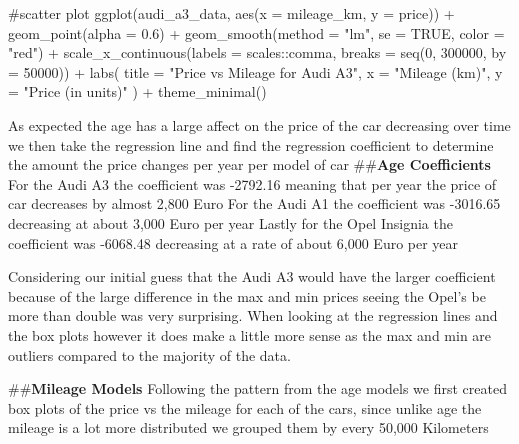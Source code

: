 \documentclass[
  letterpaper,
  DIV=11,
  numbers=noendperiod]{scrartcl}
\newenvironment{Shaded}{\begin{snugshade}}{\end{snugshade}}
\newcommand{\AttributeTok}[1]{\textcolor[rgb]{0.40,0.45,0.13}{#1}}
\newcommand{\CommentTok}[1]{\textcolor[rgb]{0.37,0.37,0.37}{#1}}
\newcommand{\ConstantTok}[1]{\textcolor[rgb]{0.56,0.35,0.01}{#1}}
\newcommand{\DecValTok}[1]{\textcolor[rgb]{0.68,0.00,0.00}{#1}}
\newcommand{\FloatTok}[1]{\textcolor[rgb]{0.68,0.00,0.00}{#1}}
\newcommand{\FunctionTok}[1]{\textcolor[rgb]{0.28,0.35,0.67}{#1}}
\newcommand{\NormalTok}[1]{\textcolor[rgb]{0.00,0.23,0.31}{#1}}
\newcommand{\SpecialCharTok}[1]{\textcolor[rgb]{0.37,0.37,0.37}{#1}}
\newcommand{\StringTok}[1]{\textcolor[rgb]{0.13,0.47,0.30}{#1}}
\begin{document}
\begin{Shaded}
\begin{Highlighting}[]
\CommentTok{\#scatter plot}
\FunctionTok{ggplot}\NormalTok{(audi\_a3\_data, }\FunctionTok{aes}\NormalTok{(}\AttributeTok{x =}\NormalTok{ mileage\_km, }\AttributeTok{y =}\NormalTok{ price)) }\SpecialCharTok{+}
  \FunctionTok{geom\_point}\NormalTok{(}\AttributeTok{alpha =} \FloatTok{0.6}\NormalTok{) }\SpecialCharTok{+}
  \FunctionTok{geom\_smooth}\NormalTok{(}\AttributeTok{method =} \StringTok{"lm"}\NormalTok{, }\AttributeTok{se =} \ConstantTok{TRUE}\NormalTok{, }\AttributeTok{color =} \StringTok{"red"}\NormalTok{) }\SpecialCharTok{+}
  \FunctionTok{scale\_x\_continuous}\NormalTok{(}\AttributeTok{labels =}\NormalTok{ scales}\SpecialCharTok{::}\NormalTok{comma, }\AttributeTok{breaks =} \FunctionTok{seq}\NormalTok{(}\DecValTok{0}\NormalTok{, }\DecValTok{300000}\NormalTok{, }\AttributeTok{by =} \DecValTok{50000}\NormalTok{)) }\SpecialCharTok{+}
  \FunctionTok{labs}\NormalTok{(}
    \AttributeTok{title =} \StringTok{"Price vs Mileage for Audi A3"}\NormalTok{,}
    \AttributeTok{x =} \StringTok{"Mileage (km)"}\NormalTok{,}
    \AttributeTok{y =} \StringTok{"Price (in units)"}
\NormalTok{  ) }\SpecialCharTok{+}
  \FunctionTok{theme\_minimal}\NormalTok{()}
\end{Highlighting}
\end{Shaded}

As expected the age has a large affect on the price of the car
decreasing over time we then take the regression line and find the
regression coefficient to determine the amount the price changes per
year per model of car \#\#\textbf{Age Coefficients} For the Audi A3 the
coefficient was -2792.16 meaning that per year the price of car
decreases by almost 2,800 Euro For the Audi A1 the coefficient was
-3016.65 decreasing at about 3,000 Euro per year Lastly for the Opel
Insignia the coefficient was -6068.48 decreasing at a rate of about
6,000 Euro per year

Considering our initial guess that the Audi A3 would have the larger
coefficient because of the large difference in the max and min prices
seeing the Opel's be more than double was very surprising. When looking
at the regression lines and the box plots however it does make a little
more sense as the max and min are outliers compared to the majority of
the data.

\#\#\textbf{Mileage Models} Following the pattern from the age models we
first created box plots of the price vs the mileage for each of the
cars, since unlike age the mileage is a lot more distributed we grouped
them by every 50,000 Kilometers
\end{document}
